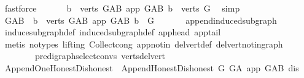 \begin{isabellebody}
\ fastforce\ \isanewline
\ \ \isamarkupfalse%
\ \isamarkupfalse%
\ {\isachardoublequoteopen}{\isacharbraceleft}{\kern0pt}b\ {\isasymin}\ verts\ G{\isacharunderscore}{\kern0pt}AB{\isachardot}{\kern0pt}\ app\ {\isasymrightarrow}\isactrlsup {\isacharplus}{\kern0pt}\isactrlbsub G{\isacharunderscore}{\kern0pt}AB\isactrlesub \ b{\isacharbraceright}{\kern0pt}\ {\isacharequal}{\kern0pt}\ verts\ G{\isachardoublequoteclose}\ \isamarkupfalse%
\ simp\ \isanewline
\ \ \isamarkupfalse%
\ \isamarkupfalse%
\ {\isachardoublequoteopen}G{\isacharunderscore}{\kern0pt}AB\ {\isasymrestriction}\ {\isacharbraceleft}{\kern0pt}b\ {\isasymin}\ verts\ G{\isacharunderscore}{\kern0pt}AB{\isachardot}{\kern0pt}\ app\ {\isasymrightarrow}\isactrlsup {\isacharplus}{\kern0pt}\isactrlbsub G{\isacharunderscore}{\kern0pt}AB\isactrlesub \ b{\isacharbraceright}{\kern0pt}\ {\isacharequal}{\kern0pt}\ G{\isachardoublequoteclose}\ \isanewline
\ \ \ \ \isamarkupfalse%
\ append{\isacharunderscore}{\kern0pt}induced{\isacharunderscore}{\kern0pt}subgraph{}\ \isanewline
\ \ \ \ \isamarkupfalse%
\ induce{\isacharunderscore}{\kern0pt}subgraph{\isacharunderscore}{\kern0pt}def\ induced{\isacharunderscore}{\kern0pt}subgraph{\isacharunderscore}{\kern0pt}def\ app{}{\isacharunderscore}{\kern0pt}head\ app{}{\isacharunderscore}{\kern0pt}tail\isanewline
\ \ \ \ \isamarkupfalse%
\ {\isacharparenleft}{\kern0pt}metis\ {\isacharparenleft}{\kern0pt}no{\isacharunderscore}{\kern0pt}types{\isacharcomma}{\kern0pt}\ lifting{\isacharparenright}{\kern0pt}\ Collect{\isacharunderscore}{\kern0pt}cong\ app{\isacharunderscore}{\kern0pt}notin\ del{\isacharunderscore}{\kern0pt}vert{\isacharunderscore}{\kern0pt}def\ del{\isacharunderscore}{\kern0pt}vert{\isacharunderscore}{\kern0pt}not{\isacharunderscore}{\kern0pt}in{\isacharunderscore}{\kern0pt}graph\ \isanewline
\ \ \ \ \ \ \ \ pre{\isacharunderscore}{\kern0pt}digraph{\isachardot}{\kern0pt}select{\isacharunderscore}{\kern0pt}convs{\isacharparenleft}{\kern0pt}{}{\isacharparenright}{\kern0pt}\ verts{\isacharunderscore}{\kern0pt}del{\isacharunderscore}{\kern0pt}vert{\isacharparenright}{\kern0pt}\isanewline
\isanewline
{}\isamarkupfalse%
%
\endisatagproof
{\isafoldproof}%
%
\isadelimproof
\isanewline
%
\endisadelimproof
{}\isamarkupfalse%
\isanewline
\isanewline
{}\isamarkupfalse%
\ Append{\isacharunderscore}{\kern0pt}One{\isacharunderscore}{\kern0pt}Honest{\isacharunderscore}{\kern0pt}Dishonest\ {\isasymsubseteq}\ Append{\isacharunderscore}{\kern0pt}Honest{\isacharunderscore}{\kern0pt}Dishonest\ G\ G{\isacharunderscore}{\kern0pt}A\ {\isachardoublequoteopen}{\isacharbraceleft}{\kern0pt}app{\isacharbraceright}{\kern0pt}{\isachardoublequoteclose}\ G{\isacharunderscore}{\kern0pt}AB\ {\isachardoublequoteopen}{\isacharbraceleft}{\kern0pt}dis{\isacharbraceright}{\kern0pt}{\isachardoublequoteclose}\isanewline

\end{isabellebody}
